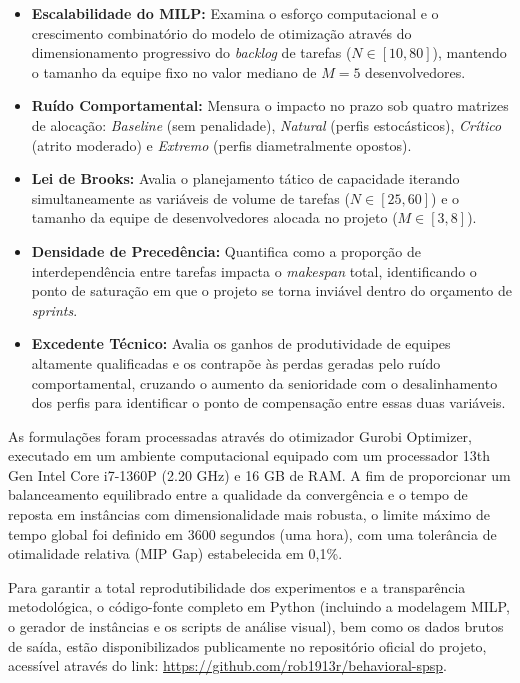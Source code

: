 \documentclass[a4paper,11pt]{article}
\begin{document}
\begin{itemize}
    \item \textbf{Escalabilidade do MILP:} Examina o esforço computacional e o 
    crescimento combinatório do modelo de otimização através do dimensionamento 
    progressivo do \textit{backlog} de tarefas ($N \in [10, 80]$), mantendo o 
    tamanho da equipe fixo no valor mediano de $M = 5$ desenvolvedores.
    \item \textbf{Ruído Comportamental:} Mensura o impacto no prazo sob quatro 
    matrizes de alocação: \textit{Baseline} (sem penalidade), \textit{Natural} 
    (perfis estocásticos), \textit{Crítico} (atrito moderado) e \textit{Extremo} 
    (perfis diametralmente opostos).
    \item \textbf{Lei de Brooks:} Avalia o planejamento tático de capacidade 
    iterando simultaneamente as variáveis de volume de tarefas ($N \in [25, 60]$) 
    e o tamanho da equipe de desenvolvedores alocada no projeto ($M \in [3, 8]$).
    \item \textbf{Densidade de Precedência:} Quantifica como a proporção de interdependência 
    entre tarefas impacta o \textit{makespan} total, identificando o ponto de saturação em 
    que o projeto se torna inviável dentro do orçamento de \textit{sprints}.
    \item \textbf{Excedente Técnico:} Avalia os ganhos de produtividade de equipes 
    altamente qualificadas e os contrapõe às perdas geradas pelo ruído comportamental,
    cruzando o aumento da senioridade com o desalinhamento dos perfis para 
    identificar o ponto de compensação entre essas duas variáveis.
\end{itemize}

As formulações foram processadas através do otimizador Gurobi Optimizer, executado 
em um ambiente computacional equipado com um processador 13th Gen Intel Core i7-1360P 
(2.20 GHz) e 16 GB de RAM. A fim de proporcionar um balanceamento equilibrado entre a 
qualidade da convergência e o tempo de reposta em instâncias com dimensionalidade mais 
robusta, o limite máximo de tempo global foi definido em 3600 segundos (uma hora), com 
uma tolerância de otimalidade relativa (MIP Gap) estabelecida em 0,1\%.

Para garantir a total reprodutibilidade dos experimentos e a transparência metodológica,
o código-fonte completo em Python (incluindo a modelagem MILP, o gerador de instâncias
e os scripts de análise visual), bem como os dados brutos de saída, estão disponibilizados
publicamente no repositório oficial do projeto, acessível através do link:
\url{https://github.com/rob1913r/behavioral-spsp}.
\end{document}
